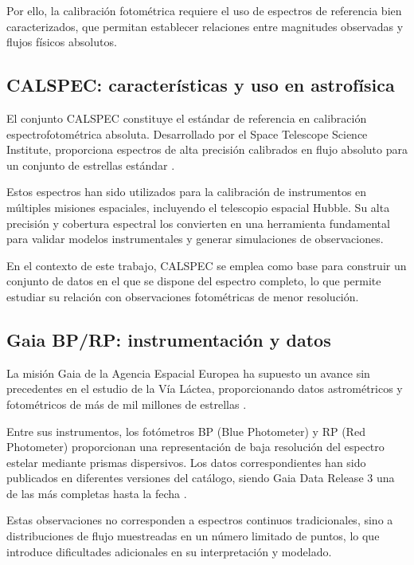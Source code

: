 \documentclass{article}
\begin{document}
Por ello, la calibración fotométrica requiere el uso de espectros de referencia bien caracterizados, que permitan establecer relaciones entre magnitudes observadas y flujos físicos absolutos.

\subsection{CALSPEC: características y uso en astrofísica}

El conjunto CALSPEC constituye el estándar de referencia en calibración espectrofotométrica absoluta. Desarrollado por el Space Telescope Science Institute, proporciona espectros de alta precisión calibrados en flujo absoluto para un conjunto de estrellas estándar \cite{bohlin2014}.

Estos espectros han sido utilizados para la calibración de instrumentos en múltiples misiones espaciales, incluyendo el telescopio espacial Hubble. Su alta precisión y cobertura espectral los convierten en una herramienta fundamental para validar modelos instrumentales y generar simulaciones de observaciones.

\vspace{0.25cm} En el contexto de este trabajo, CALSPEC se emplea como base para construir un conjunto de datos en el que se dispone del espectro completo, lo que permite estudiar su relación con observaciones fotométricas de menor resolución.

\subsection{Gaia BP/RP: instrumentación y datos}

La misión Gaia de la Agencia Espacial Europea ha supuesto un avance sin precedentes en el estudio de la Vía Láctea, proporcionando datos astrométricos y fotométricos de más de mil millones de estrellas \cite{gaia2016}.

Entre sus instrumentos, los fotómetros BP (Blue Photometer) y RP (Red Photometer) proporcionan una representación de baja resolución del espectro estelar mediante prismas dispersivos. Los datos correspondientes han sido publicados en diferentes versiones del catálogo, siendo Gaia Data Release 3 una de las más completas hasta la fecha \cite{gaia2022}.

Estas observaciones no corresponden a espectros continuos tradicionales, sino a distribuciones de flujo muestreadas en un número limitado de puntos, lo que introduce dificultades adicionales en su interpretación y modelado.
\end{document}
